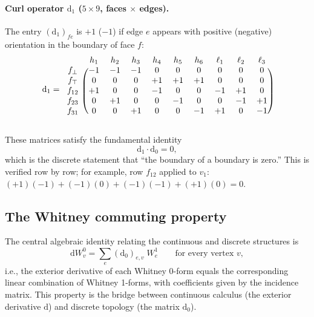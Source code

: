\documentclass[11pt,a4paper]{article}
\newcommand{\dd}{\mathrm{d}}
\begin{document}
\paragraph{Curl operator $\dd_1$ ($5\times 9$, faces $\times$ edges).}
The entry $(\dd_1)_{fe}$ is $+1$ ($-1$) if edge $e$ appears with positive
(negative) orientation in the boundary of face $f$:
\begin{equation}
  \dd_1 =
  \begin{blockarray}{cccccccccc}
    & h_1 & h_2 & h_3 & h_4 & h_5 & h_6 & \ell_1 & \ell_2 & \ell_3 \\
    \begin{block}{c(ccccccccc)}
      f_\bot & -1 & -1 & -1 & 0 & 0 & 0 & 0 & 0 & 0 \\
      f_\top & 0 & 0 & 0 & +1 & +1 & +1 & 0 & 0 & 0 \\
      f_{12} & +1 & 0 & 0 & -1 & 0 & 0 & -1 & +1 & 0 \\
      f_{23} & 0 & +1 & 0 & 0 & -1 & 0 & 0 & -1 & +1 \\
      f_{31} & 0 & 0 & +1 & 0 & 0 & -1 & +1 & 0 & -1 \\
    \end{block}
  \end{blockarray}
  \label{eq:d1}
\end{equation}

These matrices satisfy the fundamental identity
\begin{equation}
  \dd_1 \cdot \dd_0 = 0,
  \label{eq:dd_zero}
\end{equation}
which is the discrete statement that ``the boundary of a boundary is zero.''
This is verified row by row; for example, row $f_{12}$ applied to $v_1$:
$(+1)(-1) + (-1)(0) + (-1)(-1) + (+1)(0) = 0$.

\subsection{The Whitney commuting property}
\label{sec:commuting}

The central algebraic identity relating the continuous and discrete structures
is
\begin{equation}
  \boxed{
    \dd W^0_v = \sum_e (\dd_0)_{e,v}\;W^1_e
    \qquad \text{for every vertex } v,
  }
  \label{eq:commuting}
\end{equation}
i.e., the exterior derivative of each Whitney 0-form equals the corresponding
linear combination of Whitney 1-forms, with coefficients given by the incidence
matrix. This property is the bridge between continuous calculus (the exterior
derivative $\dd$) and discrete topology (the matrix $\dd_0$).
\end{document}

